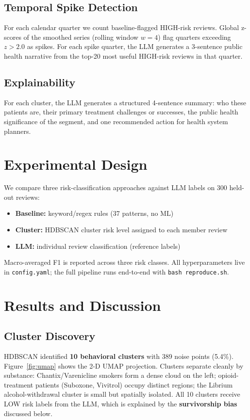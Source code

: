 \documentclass[10pt,twocolumn]{article}
\begin{document}
\subsection{Temporal Spike Detection}
For each calendar quarter we count baseline-flagged HIGH-risk reviews.
Global z-scores of the smoothed series (rolling window $w=4$) flag quarters
exceeding $z > 2.0$ as spikes. For each spike quarter, the LLM generates a
3-sentence public health narrative from the top-20 most useful HIGH-risk
reviews in that quarter.

\subsection{Explainability}
For each cluster, the LLM generates a structured 4-sentence summary: who
these patients are, their primary treatment challenges or successes, the
public health significance of the segment, and one recommended action for
health system planners.

\section{Experimental Design}
We compare three risk-classification approaches against LLM labels on 300
held-out reviews:

\begin{itemize}[noitemsep,topsep=2pt]
  \item \textbf{Baseline:} keyword/regex rules (37 patterns, no ML)
  \item \textbf{Cluster:} HDBSCAN cluster risk level assigned to each
        member review
  \item \textbf{LLM:} individual review classification (reference labels)
\end{itemize}

Macro-averaged F1 is reported across three risk classes. All hyperparameters
live in \texttt{config.yaml}; the full pipeline runs end-to-end with
\texttt{bash reproduce.sh}.

\section{Results and Discussion}

\subsection{Cluster Discovery}
HDBSCAN identified \textbf{10 behavioral clusters} with 389 noise points
(5.4\%). Figure~\ref{fig:umap} shows the 2-D UMAP projection. Clusters
separate cleanly by substance: Chantix/Varenicline smokers form a dense
cloud on the left; opioid-treatment patients (Suboxone, Vivitrol) occupy
distinct regions; the Librium alcohol-withdrawal cluster is small but
spatially isolated. All 10 clusters receive LOW risk labels from the LLM,
which is explained by the \textbf{survivorship bias} discussed below.
\end{document}
